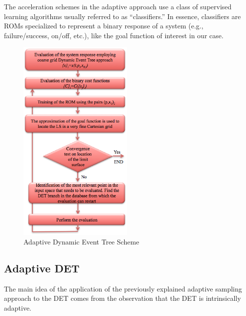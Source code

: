 The acceleration schemes in the adaptive approach use a class of supervised learning algorithms usually referred to as “classifiers.” In essence, classifiers are ROMs specialized to represent a binary response of a system (e.g., failure/success, on/off, etc.), like the goal function of interest in our case.
\begin{figure}[h]
  \centering
     \includegraphics[width=0.5\textwidth]{figures/AdaptiveDET.png}
  \caption{Adaptive Dynamic Event Tree Scheme}
  \label{fig:AdaptiveDET}
\end{figure}
\subsection{Adaptive DET}
The main idea of the application of the previously explained adaptive sampling approach to the DET comes from the observation that the DET is intrinsically adaptive.

